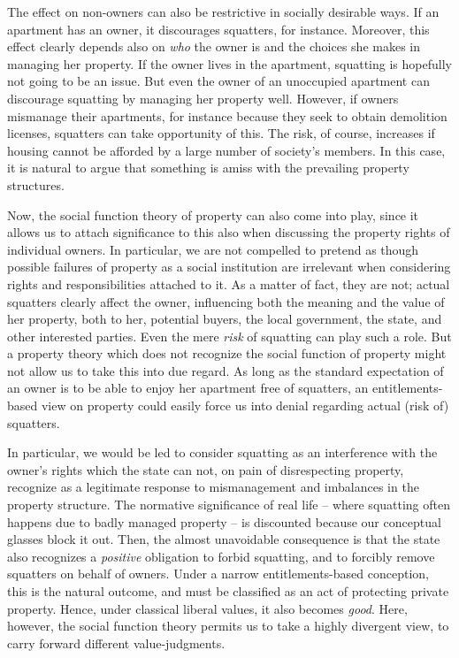 \documentclass[12pt,a4paper]{book} %
\begin{document}
The effect on non-owners can also be restrictive in socially desirable ways. If an apartment has an owner, it discourages squatters, for instance. Moreover, this effect clearly depends also on {\it who} the owner is and the choices she makes in managing her property. If the owner lives in the apartment, squatting is hopefully not going to be an issue. But even the owner of an unoccupied apartment can discourage squatting by managing her property well. However, if owners mismanage their apartments, for instance because they seek to obtain demolition licenses, squatters can take opportunity of this. The risk, of course, increases if housing cannot be afforded by a large number of society's members. In this case, it is natural to argue that something is amiss with the prevailing property structures.

Now, the social function theory of property can also come into play, since it allows us to attach significance to this also when discussing the property rights of individual owners.  In particular, we are not compelled to pretend as though possible failures of property as a social institution are irrelevant when considering rights and responsibilities attached to it. As a matter of fact, they are not; actual squatters clearly affect the owner, influencing both the meaning and the value of her property, both to her, potential buyers, the local government, the state, and other interested parties. Even the mere {\it risk} of squatting can play such a role. But a property theory which does not recognize the social function of property might not allow us to take this into due regard. As long as the standard expectation of an owner is to be able to enjoy her apartment free of squatters, an entitlements-based view on property could easily force us into denial regarding actual (risk of) squatters.

In particular, we would be led to consider squatting as an interference with the owner's rights which the state can not, on pain of disrespecting property, recognize as a legitimate response to mismanagement and imbalances in the property structure. The normative significance of real life -- where squatting often happens due to badly managed property -- is discounted  because our conceptual glasses block it out. Then, the almost unavoidable consequence is that the state also recognizes a {\it positive} obligation to forbid squatting, and to forcibly remove squatters on behalf of owners. Under a narrow entitlements-based conception, this is the natural outcome, and must be classified as an act of protecting private property. Hence, under classical liberal values, it also becomes {\it good}. Here, however, the social function theory permits us to take a highly divergent view, to carry forward different value-judgments.
\end{document}
